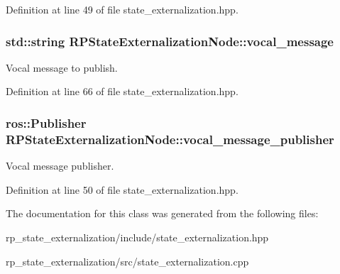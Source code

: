 \-Definition at line 49 of file state\-\_\-externalization.\-hpp.

\hypertarget{class_r_p_state_externalization_node_a81cda9545dd12f64e184c6b6ebb82368}{
\subsubsection[{vocal\-\_\-message}]{\setlength{\rightskip}{0pt plus 5cm}std\-::string {\bf \-R\-P\-State\-Externalization\-Node\-::vocal\-\_\-message}}}\label{class_r_p_state_externalization_node_a81cda9545dd12f64e184c6b6ebb82368}
\-Vocal message to publish. 

\-Definition at line 66 of file state\-\_\-externalization.\-hpp.

\hypertarget{class_r_p_state_externalization_node_a78d2e05f5ef3b194b719a27b44db91d3}{
\subsubsection[{vocal\-\_\-message\-\_\-publisher}]{\setlength{\rightskip}{0pt plus 5cm}ros\-::\-Publisher {\bf \-R\-P\-State\-Externalization\-Node\-::vocal\-\_\-message\-\_\-publisher}}}\label{class_r_p_state_externalization_node_a78d2e05f5ef3b194b719a27b44db91d3}
\-Vocal message publisher. 

\-Definition at line 50 of file state\-\_\-externalization.\-hpp.



\-The documentation for this class was generated from the following files\-:\begin{DoxyCompactItemize}
\item 
rp\-\_\-state\-\_\-externalization/include/state\-\_\-externalization.\-hpp\item 
rp\-\_\-state\-\_\-externalization/src/state\-\_\-externalization.\-cpp\end{DoxyCompactItemize}
